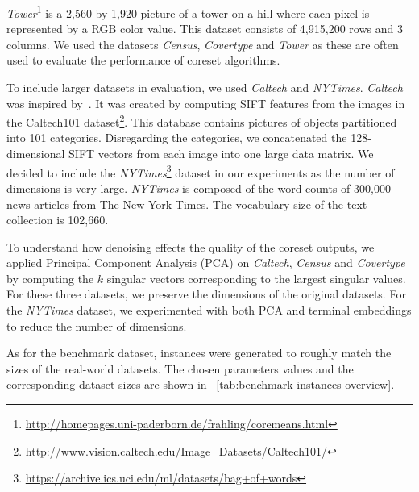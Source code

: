 \textit{Tower}\footnote{\url{http://homepages.uni-paderborn.de/frahling/coremeans.html}} is a 2,560 by 1,920 picture of a tower on a hill where each pixel is represented by a RGB color value. This dataset consists of 4,915,200 rows and 3 columns. 
We used the datasets \textit{Census}, \textit{Covertype} and \textit{Tower} as these are often used to evaluate the performance of coreset algorithms. 

To include larger datasets in evaluation, we used \textit{Caltech} and \textit{NYTimes}. \textit{Caltech} was inspired by~\cite{FGSSS13}. It was created by computing SIFT features from the images in the Caltech101 dataset\footnote{\url{http://www.vision.caltech.edu/Image_Datasets/Caltech101/}}. This database contains pictures of objects partitioned into 101 categories. Disregarding the categories, we concatenated the 128-dimensional SIFT vectors from each image into one large data matrix. 
We decided to include the \textit{NYTimes}\footnote{\url{https://archive.ics.uci.edu/ml/datasets/bag+of+words}} dataset in our experiments as the number of dimensions is very large. \textit{NYTimes} is composed of the word counts of 300,000 news articles from The New York Times. The vocabulary size of the text collection is 102,660.

To understand how denoising effects the quality of the coreset outputs, we applied Principal Component Analysis (PCA) on \textit{Caltech}, \textit{Census} and \textit{Covertype} by computing the $k$ singular vectors corresponding to the largest singular values. For these three datasets, we preserve the dimensions of the original datasets. For the \textit{NYTimes} dataset, we experimented with both PCA and terminal embeddings to reduce the number of dimensions.

As for the benchmark dataset, instances were generated to roughly match the sizes of the real-world datasets. The chosen parameters values and the corresponding dataset sizes are shown in ~\cref{tab:benchmark-instances-overview}. 





